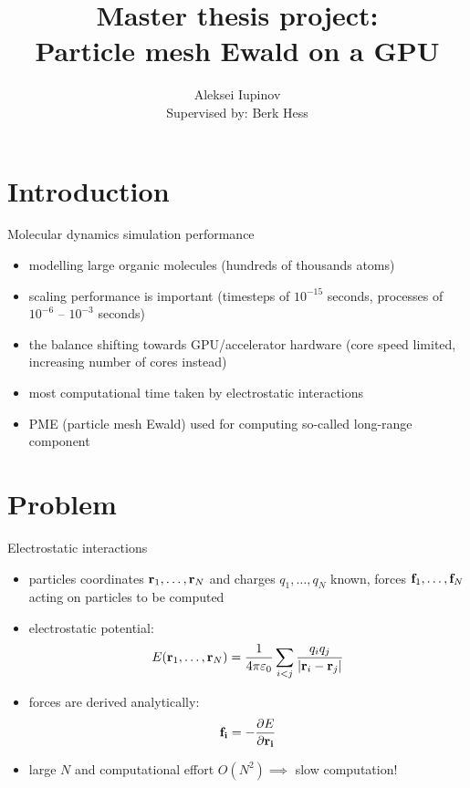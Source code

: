 \documentclass[11pt]{beamer}
\author[Aleksei Iupinov]{Aleksei Iupinov\\{\footnotesize Supervised by: Berk Hess}}
\title{Master thesis project: \\Particle mesh Ewald on a GPU}
\institute{KTH Royal Institute of Technology}
\begin{document}
\captionsetup[figure]{labelformat=empty}

\begin{frame}
\titlepage
\end{frame}

\begin{frame}
\tableofcontents
\end{frame}

\section{Introduction}
\begin{frame}{Molecular dynamics simulation performance}
\begin{itemize}
\item modelling large organic molecules (hundreds of thousands atoms)
\item scaling performance is important (timesteps of $10^{-15}$ seconds, processes of $10^{-6}$ -- $10^{-3}$ seconds) 
\item the balance shifting towards GPU/accelerator hardware (core speed limited, increasing number of cores instead)
\item most computational time taken by electrostatic interactions
\item PME (particle mesh Ewald) used for computing so-called long-range component
\end{itemize}
\end{frame}

\section{Problem}
\begin{frame}{Electrostatic interactions}
\begin{itemize}
\item particles coordinates $\bold{r}_1, \dotsc, \bold{r}_N$ and charges $q_1, \dotsc, q_N$ known, forces $\bold{f}_1, \dotsc, \bold{f}_N$ acting on particles to be computed 
\item electrostatic potential:
\[E(\bold{r}_1, \dotsc, \bold{r}_N) = \frac{1}{4 \pi \varepsilon_0}\sum\limits_{i < j}\frac{q_i q_j}{\lvert \bold{r}_i-\bold{r}_j\rvert}\]
\item forces are derived analytically:
\[\bold{f_i} = -\frac{\partial E}{\partial \bold{r_i}} \]
\item large $N$ and computational effort $O(N^2) \implies$ slow computation!
\end{itemize}
\end{frame}
\end{document}
